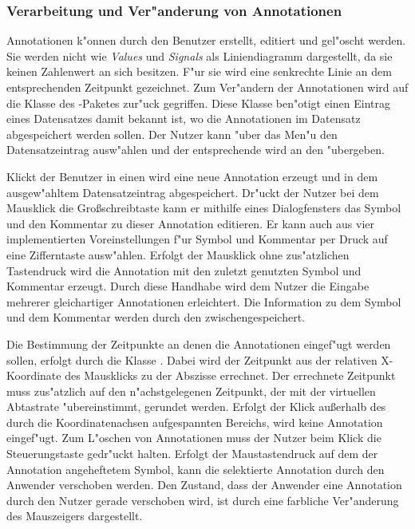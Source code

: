 
\subsubsection{Verarbeitung und Ver"anderung von Annotationen}
\label{sec:edit_annotations}

Annotationen k"onnen durch den Benutzer erstellt, editiert und gel"oscht werden.
Sie werden nicht wie \emph{Values} und \emph{Signals} als Liniendiagramm dargestellt, da sie keinen Zahlenwert an sich besitzen.
F"ur sie wird eine senkrechte Linie an dem entsprechenden Zeitpunkt gezeichnet.
Zum Ver"andern der Annotationen wird auf die Klasse  des -Paketes zur"uck gegriffen.
Diese Klasse ben"otigt einen Eintrag eines Datensatzes damit bekannt ist, wo die Annotationen im Datensatz abgespeichert werden sollen.
Der Nutzer kann "uber das Men"u den Datensatzeintrag ausw"ahlen und der entsprechende  wird an den  "ubergeben.

Klickt der Benutzer in einen  wird eine neue Annotation erzeugt und in dem ausgew"ahltem Datensatzeintrag abgespeichert.
Dr"uckt der Nutzer bei dem Mausklick die Gro{\ss}schreibtaste kann er mithilfe eines Dialogfensters das Symbol und den Kommentar zu dieser Annotation editieren.
Er kann auch aus vier implementierten Voreinstellungen f"ur Symbol und Kommentar per Druck auf eine Zifferntaste ausw"ahlen.
Erfolgt der Mausklick ohne zus"atzlichen Tastendruck wird die Annotation mit den zuletzt genutzten Symbol und Kommentar erzeugt.
Durch diese Handhabe wird dem Nutzer die Eingabe mehrerer gleichartiger Annotationen erleichtert.
Die Information zu dem Symbol und dem Kommentar werden durch den  zwischengespeichert.

Die Bestimmung der Zeitpunkte an denen die Annotationen eingef"ugt werden sollen, erfolgt durch die Klasse .
Dabei wird der Zeitpunkt aus der relativen X-Koordinate des Mausklicks zu der Abszisse errechnet.
Der errechnete Zeitpunkt muss zus"atzlich auf den n"achstgelegenen Zeitpunkt, der mit der virtuellen Abtastrate "ubereinstimmt, gerundet werden.
Erfolgt der Klick au{\ss}erhalb des durch die Koordinatenachsen aufgespannten Bereichs, wird keine Annotation eingef"ugt.
Zum L"oschen von Annotationen muss der Nutzer beim Klick die Steuerungstaste gedr"uckt halten.
Erfolgt der Maustastendruck auf dem der Annotation angeheftetem Symbol, kann die selektierte Annotation durch den Anwender verschoben werden.
Den Zustand, dass der Anwender eine Annotation durch den Nutzer gerade verschoben wird, ist durch eine farbliche Ver"anderung des Mauszeigers dargestellt.

